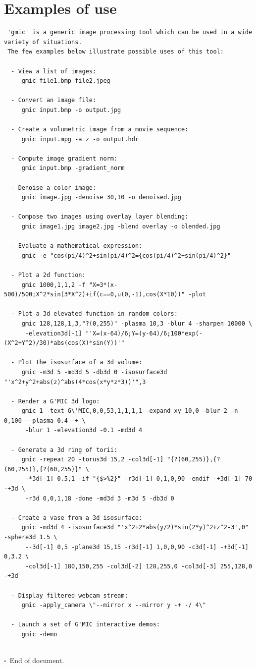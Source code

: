 \documentclass[a4paper,11pt,twoside]{book}
\begin{document}
\section{Examples of use}
\small
\begin{lstlisting}
 'gmic' is a generic image processing tool which can be used in a wide variety of situations. 
 The few examples below illustrate possible uses of this tool: 
 
  - View a list of images: 
     gmic file1.bmp file2.jpeg 
 
  - Convert an image file: 
     gmic input.bmp -o output.jpg 
 
  - Create a volumetric image from a movie sequence: 
     gmic input.mpg -a z -o output.hdr 
 
  - Compute image gradient norm: 
     gmic input.bmp -gradient_norm 
 
  - Denoise a color image: 
     gmic image.jpg -denoise 30,10 -o denoised.jpg 
 
  - Compose two images using overlay layer blending: 
     gmic image1.jpg image2.jpg -blend overlay -o blended.jpg 
 
  - Evaluate a mathematical expression: 
     gmic -e "cos(pi/4)^2+sin(pi/4)^2={cos(pi/4)^2+sin(pi/4)^2}" 
 
  - Plot a 2d function: 
     gmic 1000,1,1,2 -f "X=3*(x-500)/500;X^2*sin(3*X^2)+if(c==0,u(0,-1),cos(X*10))" -plot 
 
  - Plot a 3d elevated function in random colors: 
     gmic 128,128,1,3,"?(0,255)" -plasma 10,3 -blur 4 -sharpen 10000 \ 
      -elevation3d[-1] "'X=(x-64)/6;Y=(y-64)/6;100*exp(-(X^2+Y^2)/30)*abs(cos(X)*sin(Y))'" 
 
  - Plot the isosurface of a 3d volume: 
     gmic -m3d 5 -md3d 5 -db3d 0 -isosurface3d "'x^2+y^2+abs(z)^abs(4*cos(x*y*z*3))'",3 
 
  - Render a G'MIC 3d logo: 
     gmic 1 -text G\'MIC,0,0,53,1,1,1,1 -expand_xy 10,0 -blur 2 -n 0,100 --plasma 0.4 -+ \ 
      -blur 1 -elevation3d -0.1 -md3d 4 
 
  - Generate a 3d ring of torii: 
     gmic -repeat 20 -torus3d 15,2 -col3d[-1] "{?(60,255)},{?(60,255)},{?(60,255)}" \ 
      -*3d[-1] 0.5,1 -if "{$>%2}" -r3d[-1] 0,1,0,90 -endif -+3d[-1] 70 -+3d \ 
      -r3d 0,0,1,18 -done -md3d 3 -m3d 5 -db3d 0 
 
  - Create a vase from a 3d isosurface: 
     gmic -md3d 4 -isosurface3d "'x^2+2*abs(y/2)*sin(2*y)^2+z^2-3',0" -sphere3d 1.5 \ 
      --3d[-1] 0,5 -plane3d 15,15 -r3d[-1] 1,0,0,90 -c3d[-1] -+3d[-1] 0,3.2 \ 
      -col3d[-1] 180,150,255 -col3d[-2] 128,255,0 -col3d[-3] 255,128,0 -+3d 
 
  - Display filtered webcam stream: 
     gmic -apply_camera \"--mirror x --mirror y -+ -/ 4\" 
 
  - Launch a set of G'MIC interactive demos: 
     gmic -demo 

\end{lstlisting}
\normalsize
 
\printindex 
~\\$\square$~End of document. 
\end{document}

